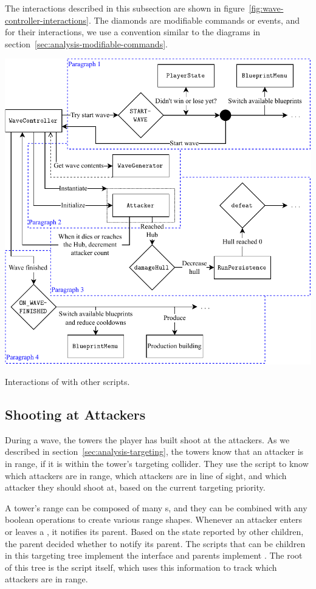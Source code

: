 The interactions described in this subsection are shown in figure~\ref{fig:wave-controller-interactions}.
The diamonds are modifiable commands or events, and for their interactions, we use a convention similar to the diagrams in section~\ref{sec:analysis-modifiable-commands}.
\begin{center}
    \captionsetup{type=figure}
    \includegraphics[width=\textwidth]{img/wave controller connections.pdf}
    \caption{Interactions of  with other scripts.}
    \label{fig:wave-controller-interactions}
\end{center}

\subsection{Shooting at Attackers}

During a wave, the towers the player has built shoot at the attackers.
As we described in section~\ref{sec:analysis-targeting}, the towers know that an attacker is in range, if it is within the tower's targeting collider.
They use the  script to know which attackers are in range, which attackers are in line of sight, and which attacker they should shoot at, based on the current targeting priority.

A tower's range can be composed of many s, and they can be combined with any boolean operations to create various range shapes.
Whenever an attacker enters or leaves a , it notifies its parent.
Based on the state reported by other children, the parent decided whether to notify its parent.
The scripts that can be children in this targeting tree implement the interface  and parents implement .
The root of this tree is the  script itself, which uses this information to track which attackers are in range.

